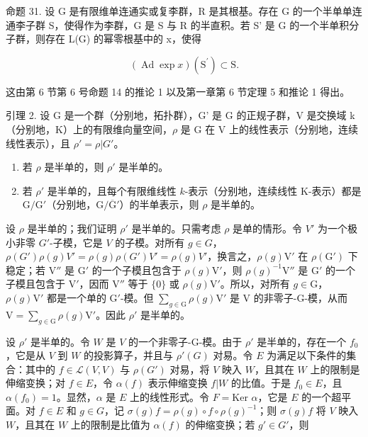 命题 31. 设 G 是有限维单连通实或复李群，R 是其根基。存在 G 的一个半单单连通李子群 S，使得作为李群，G 是 S 与 R 的半直积。若 S' 是 G 的一个半单积分子群，则存在 L(G) 的幂零根基中的 x，使得

\[
(\operatorname{Ad} \exp x) (\mathrm{S} ^ {\prime}) \subset \mathrm{S}.
\]

这由第 6 节第 6 号命题 14 的推论 1 以及第一章第 6 节定理 5 和推论 1 得出。

引理 2. 设 G 是一个群（分别地，拓扑群），G' 是 G 的正规子群，V 是交换域 k（分别地，K）上的有限维向量空间，\(\rho\) 是 G 在 V 上的线性表示（分别地，连续线性表示），且 \(\rho' = \rho|G'\)。

\begin{enumerate}
\def\labelenumi{(\roman{enumi})}
\item
  若 \(\rho\) 是半单的，则 \(\rho'\) 是半单的。
\item
  若 \(\rho'\) 是半单的，且每个有限维线性 \(k\)-表示（分别地，连续线性 K-表示）都是 \(\mathrm{G} / \mathrm{G}'\)（分别地，\(\mathrm{G} / \overline{\mathrm{G}}'\)）的半单表示，则 \(\rho\) 是半单的。
\end{enumerate}

设 \(\rho\) 是半单的；我们证明 \(\rho'\) 是半单的。只需考虑 \(\rho\) 是单的情形。令 \(V'\) 为一个极小非零 \(G'\)-子模，它是 \(V\) 的子模。对所有 \(g \in G\)，\(\rho(G') \rho(g)V' = \rho(g)\rho(G')V' = \rho(g)V'\)，换言之，\(\rho(g)\mathrm{V}'\) 在 \(\rho(\mathrm{G}')\) 下稳定；若 \(\mathrm{V}''\) 是 \(\mathrm{G}'\) 的一个子模且包含于 \(\rho(g)\mathrm{V}'\)，则 \(\rho(g)^{-1}\mathrm{V}''\) 是 \(\mathrm{G}'\) 的一个子模且包含于 \(\mathrm{V}'\)，因而 \(\mathrm{V}''\) 等于 \(\{0\}\) 或 \(\rho(g)\mathrm{V}'\)。所以，对所有 \(g \in \mathrm{G}\)，\(\rho(g)\mathrm{V}'\) 都是一个单的 \(\mathrm{G}'\)-模。但 \(\sum_{g \in \mathrm{G}} \rho(g)\mathrm{V}'\) 是 \(\mathrm{V}\) 的非零子-G-模，从而 \(\mathrm{V} = \sum_{g \in \mathrm{G}} \rho(g)\mathrm{V}'\)。因此 \(\rho'\) 是半单的。

设 \(\rho'\) 是半单的。令 \(W\) 是 \(V\) 的一个非零子-G-模。由于 \(\rho'\) 是半单的，存在一个 \(f_0\)，它是从 \(V\) 到 \(W\) 的投影算子，并且与 \(\rho'(G)\) 对易。令 \(E\) 为满足以下条件的集合：其中的 \(f \in \mathcal{L}(V, V)\) 与 \(\rho(G')\) 对易，将 \(V\) 映入 \(W\)，且其在 \(W\) 上的限制是伸缩变换；对 \(f \in E\)，令 \(\alpha(f)\) 表示伸缩变换 \(f|W\) 的比值。于是 \(f_0 \in E\)，且 \(\alpha(f_0) = 1\)。显然，\(\alpha\) 是 \(E\) 上的线性形式。令 \(F = \text{Ker } \alpha\)，它是 \(E\) 的一个超平面。对 \(f \in E\) 和 \(g \in G\)，记 \(\sigma(g)f = \rho(g) \circ f \circ \rho(g)^{-1}\)；则 \(\sigma(g)f\) 将 \(V\) 映入 \(W\)，且其在 \(W\) 上的限制是比值为 \(\alpha(f)\) 的伸缩变换；若 \(g' \in G'\)，则

